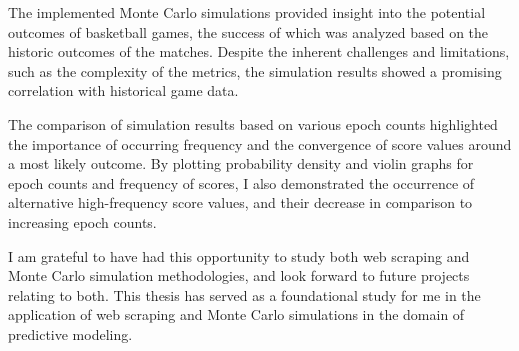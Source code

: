 \documentclass{thesis-ekf}
\theoremstyle{definition}
\theoremstyle{remark}
\begin{document}
The implemented Monte Carlo simulations provided insight into the potential outcomes of basketball games, the success of which was analyzed based on the historic outcomes of the matches. Despite the inherent challenges and limitations, such as the complexity of the metrics, the simulation results showed a promising correlation with historical game data.

The comparison of simulation results based on various epoch counts highlighted the importance of occurring frequency and the convergence of score values around a most likely outcome. By plotting probability density and violin graphs for epoch counts and frequency of scores, I also demonstrated the occurrence of alternative high-frequency score values, and their decrease in comparison to increasing epoch counts.

I am grateful to have had this opportunity to study both web scraping and Monte Carlo simulation methodologies, and look forward to future projects relating to both. This thesis has served as a foundational study for me in the application of web scraping and Monte Carlo simulations in the domain of predictive modeling.
\end{document}
